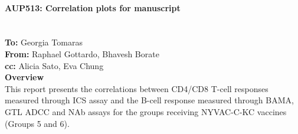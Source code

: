 \documentclass[11pt]{article}\usepackage[]{graphicx}\usepackage[]{color}
\renewcommand{\headrulewidth}{0.0pt}
\renewcommand{\footrulewidth}{0.0pt}}
\renewcommand{\headrulewidth}{0.4pt}
\renewcommand{\footrulewidth}{0.4pt}
\renewcommand{\headrulewidth}{0.8pt}
\renewcommand{\footrulewidth}{0.8pt}
\begin{document}
\newcommand{\tab}{\hspace*{2cm}} %
\newcommand{\bat}{\vspace*{2pc}} %
\textnormal {\normalfont}
\makeatletter
\let\insertdate\@date
\makeatother

\bat
\Large \textbf{\\ AUP513: Correlation plots for manuscript} \\
\large
\insertdate \\ \\
\textbf{To:} Georgia Tomaras \\
\textbf{From:} Raphael Gottardo, Bhavesh Borate \\
\textbf{cc:} Alicia Sato, Eva Chung \\

\normalsize
\textbf{Overview} \\
This report presents the correlations between CD4/CD8 T-cell responses measured through ICS assay and the B-cell response measured through BAMA, GTL ADCC and NAb assays for the groups receiving NYVAC-C-KC vaccines (Groups 5 and 6). 

\listoffigures


\newpage
\makeatletter
\patchcmd{\@fancyhead}{\rlap}{\color{gray}\rlap}{}{}
\patchcmd{\headrule}{\hrule}{\color{gray}\hrule}{}{}
\patchcmd{\@fancyfoot}{\rlap}{\color{gray}\rlap}{}{}
\patchcmd{\footrule}{\hrule}{\color{gray}\hrule}{}{}
\makeatother
\newpage
{}
\renewcommand{\headrulewidth}{0.4pt}
\renewcommand{\footrulewidth}{0.4pt}
\fancyhead[L]{}


\end{document}
